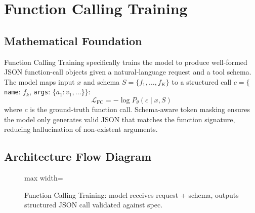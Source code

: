 \newpage
\section{Function Calling Training}

\subsection{Mathematical Foundation}
Function Calling Training specifically trains the model to produce well-formed JSON function-call objects given a natural-language request and a tool schema. The model maps input $x$ and schema $S = \{f_1,\ldots,f_K\}$ to a structured call $c = \{$\texttt{name}: $f_k$, \texttt{args}: $\{a_1{:}v_1,\ldots\}\}$:
\begin{equation}
  \mathcal{L}_{\text{FC}} = -\log P_\theta(c \mid x, S)
\end{equation}
where $c$ is the ground-truth function call. Schema-aware token masking ensures the model only generates valid JSON that matches the function signature, reducing hallucination of non-existent arguments.

\subsection{Architecture Flow Diagram}

\begin{figure}[h]
\centering
\begin{adjustbox}{max width=\linewidth}
\end{adjustbox}
\caption{Function Calling Training: model receives request + schema, outputs structured JSON call validated against spec.}
\end{figure}

